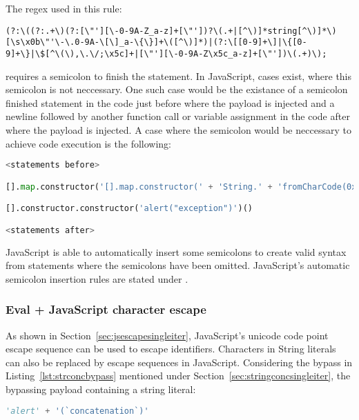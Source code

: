 The regex used in this rule:

\begin{lstlisting}[style=basicStyle]
(?:\((?:.+\)(?:[\"'][\-0-9A-Z_a-z]+[\"'])?\(.+|[^\)]*string[^\)]*\)[\s\x0b\"'\-\.0-9A-\[\]_a-\{\}]+\([^\)]*)|(?:\[[0-9]+\]|\{[0-9]+\}|\$[^\(\),\.\/;\x5c]+|[\"'][\-0-9A-Z\x5c_a-z]+[\"'])\(.+)\);
\end{lstlisting}

requires a semicolon to finish the statement. In JavaScript, cases exist, where this semicolon is not neccessary. One such case would be the existance of a semicolon finished statement in the code just before where the payload is injected and a newline followed by another function call or variable assignment in the code after where the payload is injected. A case where the semicolon would be neccessary to achieve code execution is the following:

\begin{lstlisting}[style=basicStyle, language=Python]
<statements before>

[].map.constructor('[].map.constructor(' + 'String.' + 'fromCharCode(0x61,108,0x65,114,116,0x28,96,120,115,115,0x60,0x29)' + ')();')()

[].constructor.constructor('alert("exception")')()

<statements after>
\end{lstlisting}

JavaScript is able to automatically insert some semicolons to create valid syntax from statements where the semicolons have been omitted. JavaScript's automatic semicolon insertion rules are stated under \cite{js/autosemi}.


\subsubsection{Eval + JavaScript character escape}
\label{sec:jsescapemultiiter}
As shown in Section~\ref{sec:jsescapesingleiter}, JavaScript's unicode code point escape sequence can be used to escape identifiers.
Characters in String literals can also be replaced by escape sequences in JavaScript. Considering the bypass in Listing~\ref{lst:strconcbypass} mentioned under Section~\ref{sec:stringconcsingleiter}, the bypassing payload containing a string literal:

\begin{lstlisting}[style=basicStyle, language=Python]
'alert' + '(`concatenation`)'
\end{lstlisting}

